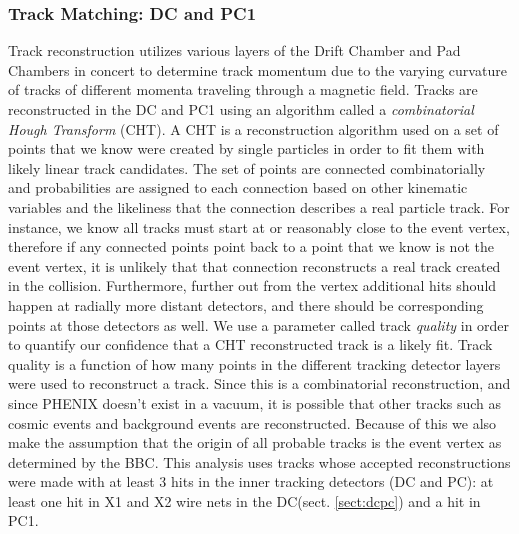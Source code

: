 \subsubsection{Track Matching: DC and PC1}
Track reconstruction utilizes various layers of the Drift Chamber and Pad Chambers in concert to determine track momentum due to the varying curvature of tracks of different momenta traveling through a magnetic field. Tracks are reconstructed in the DC and PC1 using an algorithm called a \textit{combinatorial Hough Transform} (CHT)\citep{Mitchell:2002wu}. A CHT is a reconstruction algorithm used on a set of points that we know were created by single particles in order to fit them with likely linear track candidates\citep{OHLSSON199277}. The set of points are connected combinatorially and probabilities are assigned to each connection based on other kinematic variables and the likeliness that the connection describes a real particle track. For instance, we know all tracks must start at or reasonably close to the event vertex, therefore if any connected points point back to a point that we know is not the event vertex, it is unlikely that that connection reconstructs a real track created in the collision. Furthermore, further out from the vertex additional hits should happen at radially more distant detectors, and there should be corresponding points at those detectors as well.  We use a parameter called track \textit{quality} in order to quantify our confidence that a CHT reconstructed track is a likely fit. Track quality is a function of how many points in the different tracking detector layers were used to reconstruct a track. Since this is a combinatorial reconstruction, and since PHENIX doesn't exist in a vacuum, it is possible that other tracks such as cosmic events and background events are reconstructed.  Because of this we also make the assumption that the origin of all probable tracks is the event vertex as determined by the BBC. This analysis uses tracks whose accepted reconstructions were made with at least 3 hits in the inner tracking detectors (DC and PC): at least one hit in X1 and X2 wire nets in the DC(sect. \ref{sect:dcpc}) and a hit in PC1.

